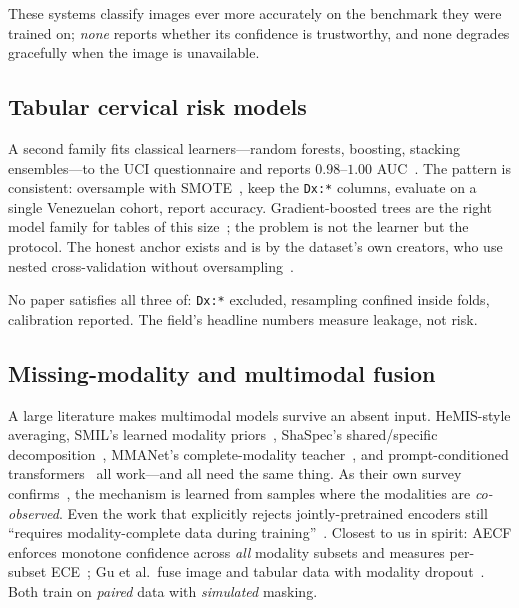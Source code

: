 \documentclass[sigplan,nonacm,screen]{acmart}
\begin{document}
\begin{gapbox}
These systems classify images ever more accurately on the benchmark they were trained on; \emph{none} reports whether its confidence is trustworthy, and none degrades gracefully when the image is unavailable.
\end{gapbox}

\subsection{Tabular cervical risk models}
A second family fits classical learners---random forests, boosting, stacking ensembles---to the UCI questionnaire and reports $0.98$--$1.00$ AUC~\cite{roy2025interpretable}. The pattern is consistent: oversample with SMOTE~\cite{chawla2002smote}, keep the \texttt{Dx:*} columns, evaluate on a single Venezuelan cohort, report accuracy. Gradient-boosted trees are the right model family for tables of this size~\cite{grinsztajn2022why}; the problem is not the learner but the protocol. The honest anchor exists and is by the dataset's own creators, who use nested cross-validation without oversampling~\cite{fernandes2018supervised}.

\begin{gapbox}
No paper satisfies all three of: \texttt{Dx:*} excluded, resampling confined inside folds, calibration reported. The field's headline numbers measure leakage, not risk.
\end{gapbox}

\subsection{Missing-modality and multimodal fusion}
A large literature makes multimodal models survive an absent input. HeMIS-style averaging, SMIL's learned modality priors~\cite{ma2021smil}, ShaSpec's shared/specific decomposition~\cite{wang2023shaspec}, MMANet's complete-modality teacher~\cite{wei2023mmanet}, and prompt-conditioned transformers~\cite{lee2023multimodal} all work---and all need the same thing. As their own survey confirms~\cite{wu2024survey}, the mechanism is learned from samples where the modalities are \emph{co-observed}. Even the work that explicitly rejects jointly-pretrained encoders still ``requires modality-complete data during training''~\cite{kim2024missing}. Closest to us in spirit: AECF enforces monotone confidence across \emph{all} modality subsets and measures per-subset ECE~\cite{chlon2025aecf}; Gu et al.\ fuse image and tabular data with modality dropout~\cite{gu2025modality}. Both train on \emph{paired} data with \emph{simulated} masking.
\end{document}

